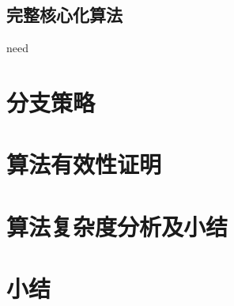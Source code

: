 \subsection{完整核心化算法}
\textcolor[rgb]{1.00,0.00,0.00}{need}

\section{分支策略}





\section{算法有效性证明}
\section{算法复杂度分析及小结}
\section{小结}